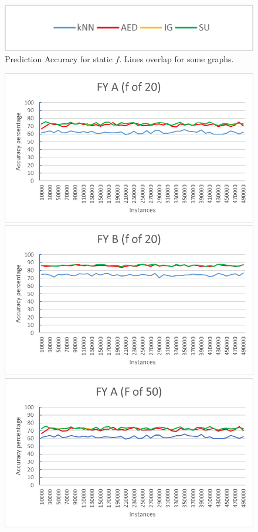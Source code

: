 \begin{figure}[h]
\begin{center}
\includegraphics[scale=0.5]{Graphs/legend}
\caption{Prediction Accuracy for static $f$. Lines overlap for some graphs.}
\label{fig:graphs1}
\end{center}
\end{figure}

\begin{figure}[h]
\begin{center}
\includegraphics[scale=0.25]{Graphs/FY_A/graph20}
\includegraphics[scale=0.25]{Graphs/FY_B/graph20}
\includegraphics[scale=0.25]{Graphs/FY_A_Drift/graph}

\end{center}
\end{figure}
